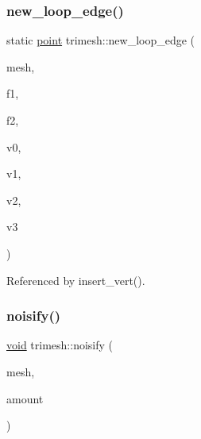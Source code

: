 \mbox{\label{namespacetrimesh_a036862d2143f0fc0bc638b1858a241d9}} 
\subsubsection{\texorpdfstring{new\+\_\+loop\+\_\+edge()}{new\_loop\_edge()}}
{\footnotesize\ttfamily static \hyperlink{namespacetrimesh_a325b99fd6454b22fa4c4bc3223271b2c}{point} trimesh\+::new\+\_\+loop\+\_\+edge (\begin{DoxyParamCaption}\item[{\hyperlink{classtrimesh_1_1TriMesh}{Tri\+Mesh} $\ast$}]{mesh,  }\item[{int}]{f1,  }\item[{int}]{f2,  }\item[{int}]{v0,  }\item[{int}]{v1,  }\item[{int}]{v2,  }\item[{int}]{v3 }\end{DoxyParamCaption})\hspace{0.3cm}{\ttfamily [static]}}



Referenced by insert\+\_\+vert().

\mbox{\label{namespacetrimesh_ad8abaeef03cff4b8d2b79fdce2ae88b1}} 
\subsubsection{\texorpdfstring{noisify()}{noisify()}}
{\footnotesize\ttfamily \hyperlink{namespacetrimesh_a784ddfd979e1c579bda795a8edfc3f43}{void} trimesh\+::noisify (\begin{DoxyParamCaption}\item[{\hyperlink{classtrimesh_1_1TriMesh}{Tri\+Mesh} $\ast$}]{mesh,  }\item[{float}]{amount }\end{DoxyParamCaption})}

\mbox{\label{namespacetrimesh_aa7cf6dde5fb8c44e0609b58e98757e03}} 
